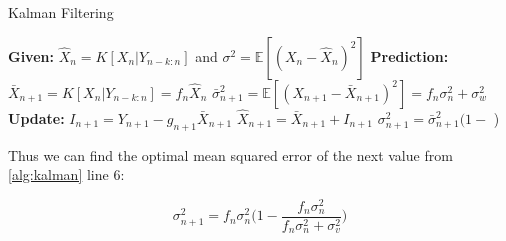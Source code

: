 \documentclass[../main.tex]{subfiles}
\begin{document}
{\begin{algorithm}
    \caption{Kalman Filtering}
    \label{alg:kalman}
    \begin{algorithmic}[1]
       \State \textbf{Given:} $\hat{X}_n = K[X_n | Y_{n-k:n}]$ and $\sigma^2 = \mathbb{E}[(X_n - \hat{X}_n)^2]$
       \Statex
       \Statex \textbf{Prediction:}
       \State $\bar{X}_{n+1} = K[X_n | Y_{n-k:n}] = f_n \hat{X}_n$
       \State $\bar{\sigma}^2_{n+1} = \mathbb{E}[(X_{n+1} - \bar{X}_{n+1})^2] = f_n \sigma_n^2 + \sigma_w^2$
       \Statex
       \Statex \textbf{Update:}
       \State $I_{n+1} = Y_{n+1} - g_{n+1}\bar{X}_{n+1}$
       \State $\hat{X}_{n+1} = \bar{X}_{n+1} + $$ I_{n+1}$
       \State $\sigma_{n+1}^2 = \bar{\sigma}_{n+1}^2 \bigg(1 - $   \bigg)
    \end{algorithmic}
 \end{algorithm}

 Thus we can find the optimal mean squared error of the next value from \cref{alg:kalman} line 6:

 \begin{equation}
    \sigma_{n+1}^2 = f_n\sigma_n^2 \bigg(1 - \frac{f_n\sigma_n^2}{ f_n\sigma_n^2 + \sigma_v^2}  \bigg)
 \end{equation}
}

\onlyinsubfile{}
\end{document}

